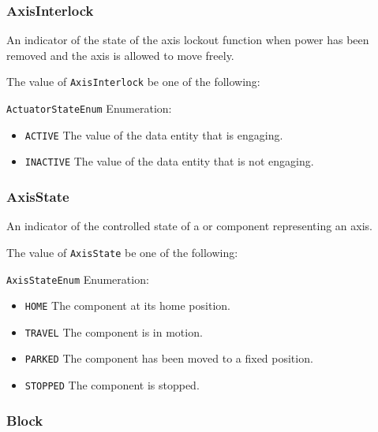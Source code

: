 \subsubsection{AxisInterlock}
\label{sec:AxisInterlock}



An indicator of the state of the axis lockout function when power has been removed and the axis is allowed to move freely.


The value of \texttt{AxisInterlock} \MUST be one of the following: 


\texttt{ActuatorStateEnum} Enumeration:

\begin{itemize}
\item \texttt{ACTIVE} \newline The value of the \gls{data entity} that is engaging. 
\item \texttt{INACTIVE} \newline The value of the \gls{data entity} that is not engaging. 
\end{itemize}



\subsubsection{AxisState}
\label{sec:AxisState}



An indicator of the controlled state of a  or  component representing an axis.


The value of \texttt{AxisState} \MUST be one of the following: 


\texttt{AxisStateEnum} Enumeration:

\begin{itemize}
\item \texttt{HOME} \newline The component at its home position. 
\item \texttt{TRAVEL} \newline The component is in motion. 
\item \texttt{PARKED} \newline The component has been moved to a fixed position. 
\item \texttt{STOPPED} \newline The component is stopped. 
\end{itemize}



\subsubsection{Block}
\label{sec:Block}



